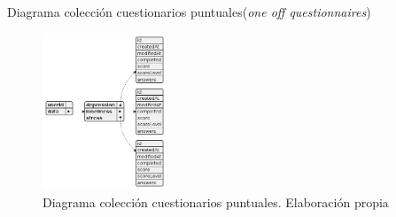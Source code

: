 Diagrama colección cuestionarios puntuales(\textit{one off questionnaires})

\begin{figure}[h]
    \centering
    \includegraphics[width=0.33\textwidth]{figures/bd/Servidor one off questionnaires.png}
    \caption[Diagrama colección cuestionarios puntuales]{Diagrama colección cuestionarios puntuales. Elaboración propia}
    \label{figure:disenio:diagrama_one_off}
\end{figure}